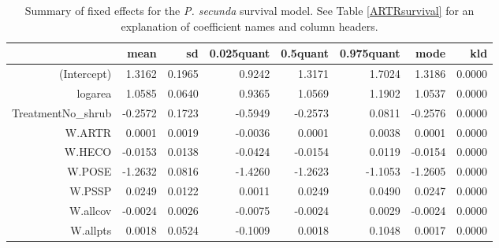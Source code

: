 \documentclass[11pt]{article}
\begin{document}
\begin{table}[ht]
\centering
\caption{Summary of fixed effects for the \textit{P. secunda} survival model. See Table \ref{ARTRsurvival} for an explanation of coefficient names
and column headers.} 
\label{POSEsurvival}
\begin{tabular}{rrrrrrrr}
  \hline
 & mean & sd & 0.025quant & 0.5quant & 0.975quant & mode & kld \\ 
  \hline
(Intercept) & 1.3162 & 0.1965 & 0.9242 & 1.3171 & 1.7024 & 1.3186 & 0.0000 \\ 
  logarea & 1.0585 & 0.0640 & 0.9365 & 1.0569 & 1.1902 & 1.0537 & 0.0000 \\ 
  TreatmentNo\_shrub & -0.2572 & 0.1723 & -0.5949 & -0.2573 & 0.0811 & -0.2576 & 0.0000 \\ 
  W.ARTR & 0.0001 & 0.0019 & -0.0036 & 0.0001 & 0.0038 & 0.0001 & 0.0000 \\ 
  W.HECO & -0.0153 & 0.0138 & -0.0424 & -0.0154 & 0.0119 & -0.0154 & 0.0000 \\ 
  W.POSE & -1.2632 & 0.0816 & -1.4260 & -1.2623 & -1.1053 & -1.2605 & 0.0000 \\ 
  W.PSSP & 0.0249 & 0.0122 & 0.0011 & 0.0249 & 0.0490 & 0.0247 & 0.0000 \\ 
  W.allcov & -0.0024 & 0.0026 & -0.0075 & -0.0024 & 0.0029 & -0.0024 & 0.0000 \\ 
  W.allpts & 0.0018 & 0.0524 & -0.1009 & 0.0018 & 0.1048 & 0.0017 & 0.0000 \\ 
   \hline
\end{tabular}
\end{table}
\end{document}
